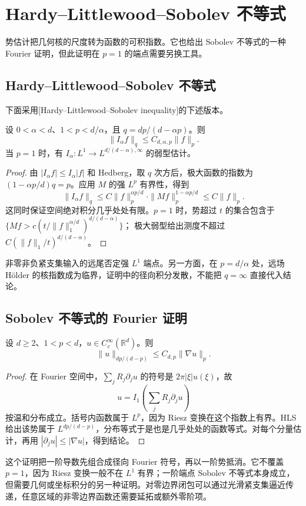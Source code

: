 \section{Hardy–Littlewood–Sobolev 不等式}
\label{b2:sec:1902}

势估计把几何核的尺度转为函数的可积指数。它也给出 Sobolev 不等式的一种 Fourier 证明，但此证明在 \(p=1\) 的端点需要另换工具。

\subsection{Hardy--Littlewood--Sobolev 不等式}
\label{b2:subsec:190201}

下面采用[Hardy--Littlewood--Sobolev inequality]的下述版本。

\begin{theorem}\label{b2:thm:19-hls}
设 \(0<\alpha<d\)、\(1<p<d/\alpha\)，且 \(q=dp/(d-\alpha p)\)。则
\[
 \|I_\alpha f\|_q\leq C_{d,\alpha,p}\|f\|_p.
\]
当 \(p=1\) 时，有 \(I_\alpha:L^1\to L^{d/(d-\alpha),\infty}\) 的弱型估计。
\end{theorem}
\begin{proof}
由 \(|I_\alpha f|\leq I_\alpha|f|\) 和 Hedberg，取 \(q\) 次方后，极大函数的指数为 \((1-\alpha p/d)q=p\)。应用 \(M\) 的强 \(L^p\) 有界性，得到
\[
 \|I_\alpha f\|_q
 \leq C\|f\|_p^{\alpha p/d}\cdot
 \|Mf\|_p^{1-\alpha p/d}
 \leq C\|f\|_p.
\]
这同时保证空间绝对积分几乎处处有限。\(p=1\) 时，势超过 \(t\) 的集合包含于
\(\{Mf>c(t/\|f\|_1^{\alpha/d})^{d/(d-\alpha)}\}\)；
极大弱型给出测度不超过 \(C(\|f\|_1/t)^{d/(d-\alpha)}\)。
\end{proof}
非零非负紧支集输入的远尾否定强 \(L^1\) 端点。另一方面，在 \(p=d/\alpha\) 处，远场 Hölder 的核指数成为临界，证明中的径向积分发散，不能把 \(q=\infty\) 直接代入结论。

\subsection{Sobolev 不等式的 Fourier 证明}
\label{b2:subsec:190202}

\begin{theorem}\label{b2:thm:19-sobolev}
设 \(d\geq2\)、\(1<p<d\)，\(u\in C_c^\infty(\mathbb R^d)\)。则
\[
 \|u\|_{dp/(d-p)}\leq C_{d,p}\|\nabla u\|_p.
\]
\end{theorem}
\begin{proof}
在 Fourier 空间中，\(\sum_jR_j\partial_ju\) 的符号是 \(2\pi|\xi|\widehat u(\xi)\)，故
\[
 u=I_1\left(\sum_jR_j\partial_ju\right)
\]
按温和分布成立。括号内函数属于 \(L^p\)，因为 Riesz 变换在这个指数上有界。HLS 给出该势属于 \(L^{dp/(d-p)}\)，分布等式于是也是几乎处处的函数等式。对每个分量估计，再用 \(|\partial_ju|\leq|\nabla u|\)，得到结论。
\end{proof}
这个证明把一阶导数先组合成径向 Fourier 符号，再以一阶势抵消。它不覆盖 \(p=1\)，因为 Riesz 变换一般不在 \(L^1\) 有界；一阶端点 Sobolev 不等式本身成立，但需要几何或坐标积分的另一种证明。对零边界闭包可以通过光滑紧支集逼近传递，任意区域的非零边界函数还需要延拓或额外零阶项。

